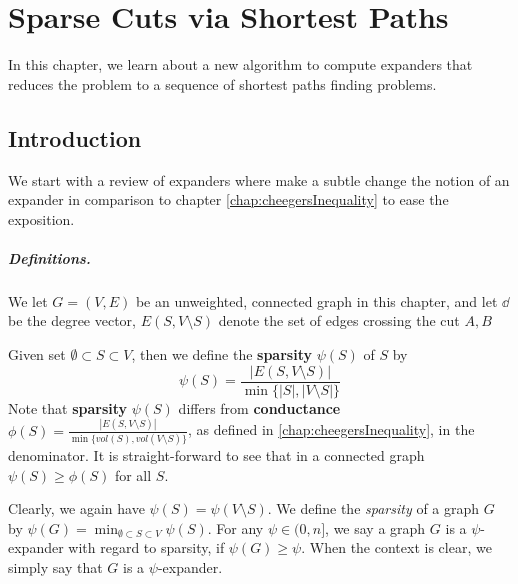 \chapter{Sparse Cuts via Shortest Paths}

\renewcommand{\vol}{\textit{vol}}
\newcommand{\APSP}{\alpha_{APSP}}

In this chapter, we learn about a new algorithm to compute expanders that reduces the problem to a sequence of shortest paths finding problems.

\section{Introduction}

We start with a review of expanders where make a subtle change the notion of an expander in comparison to chapter \ref{chap:cheegersInequality} to ease the exposition.

\paragraph{Definitions.} We let $G=(V,E)$ be an unweighted, connected graph in this chapter, and let $\dd$ be the degree vector, $E(S,V \setminus S)$ denote the set of edges crossing the cut $A,B$

Given set $\emptyset \subset S \subset V$, then we define the \textbf{sparsity} $\psi(S)$ of $S$ by
\[
\psi(S) = \frac{|E(S, V \setminus S)|}{ \min\{|S|, |V \setminus S| \} } 
\]
Note that \textbf{sparsity} $\psi(S)$ differs from \textbf{conductance} $\phi(S) = \frac{|E(S, V \setminus S)|}{ \min\{\vol(S), \vol(V \setminus S) \} }$, as defined in \ref{chap:cheegersInequality}, in the denominator. It is straight-forward to see that in a connected graph $\psi(S) \geq \phi(S)$ for all $S$. 

Clearly, we again have $\psi(S) = \psi(V \setminus S)$. We define the \emph{sparsity} of a graph $G$ by $\psi(G) = \min_{\emptyset \subset S \subset V} \psi(S)$. For any $\psi \in (0, n]$, we say a graph $G$ is a $\psi$-expander with regard to sparsity, if $\psi(G) \geq \psi$. When the context is clear, we simply say that $G$ is a $\psi$-expander. 



